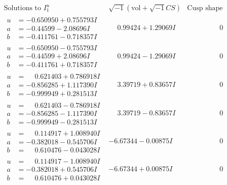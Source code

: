 \documentclass[1p]{elsarticle_modified}
\theoremstyle{definition}
\newcommand{\I}{\sqrt{-1}}
\begin{document}
$$\begin{array}{c|c|c}  
\text{Solutions to }I^u_{1}& \I (\text{vol} + \sqrt{-1}CS) & \text{Cusp shape}\\
 \hline 
\begin{aligned}
u &= -0.650950 + 0.755793 I \\
a &= -0.44599 - 2.08696 I \\
b &= -0.411761 - 0.718357 I\end{aligned}
 & \phantom{-}0.99424 + 1.29069 I & \phantom{-0.000000 } 0 \\ \hline\begin{aligned}
u &= -0.650950 - 0.755793 I \\
a &= -0.44599 + 2.08696 I \\
b &= -0.411761 + 0.718357 I\end{aligned}
 & \phantom{-}0.99424 - 1.29069 I & \phantom{-0.000000 } 0 \\ \hline\begin{aligned}
u &= \phantom{-}0.621403 + 0.786918 I \\
a &= -0.856285 + 1.117390 I \\
b &= -0.999949 + 0.281513 I\end{aligned}
 & \phantom{-}3.39719 + 0.83657 I & \phantom{-0.000000 } 0 \\ \hline\begin{aligned}
u &= \phantom{-}0.621403 - 0.786918 I \\
a &= -0.856285 - 1.117390 I \\
b &= -0.999949 - 0.281513 I\end{aligned}
 & \phantom{-}3.39719 - 0.83657 I & \phantom{-0.000000 } 0 \\ \hline\begin{aligned}
u &= \phantom{-}0.114917 + 1.008940 I \\
a &= -0.382018 - 0.545706 I \\
b &= \phantom{-}0.610476 - 0.043028 I\end{aligned}
 & -6.67344 - 0.00875 I & \phantom{-0.000000 } 0 \\ \hline\begin{aligned}
u &= \phantom{-}0.114917 - 1.008940 I \\
a &= -0.382018 + 0.545706 I \\
b &= \phantom{-}0.610476 + 0.043028 I\end{aligned}
 & -6.67344 + 0.00875 I & \phantom{-0.000000 } 0 \\ \hline\begin{aligned}

\end{aligned}
\end{array}$$
\end{document}
